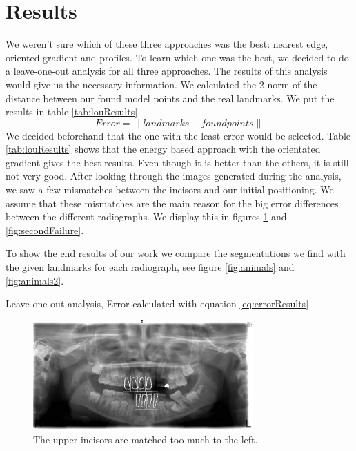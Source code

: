 \documentclass[a4paper,10pt]{article}
\begin{document}
\section{Results}\label{sec:results}

We weren't sure which of these three approaches was the best: nearest edge, oriented gradient and profiles. To learn which one was the best, we decided to do a leave-one-out analysis for all three approaches.  The results of this analysis would give us the necessary information. We calculated the 2-norm of the distance between our found model points and the real landmarks. We put the results in table \ref{tab:louResults}.
\begin{equation} \label{eq:errorResults}
Error = \|landmarks - foundpoints\|
\end{equation}
We decided beforehand that the one with the least error would be selected. Table  \ref{tab:louResults} shows that the energy based approach with the orientated gradient gives the best results. Even though it is better than the others, it is still not very good. After looking through the images generated during the analysis, we saw a few mismatches between the incisors and our initial positioning. We assume that these mismatches are the main reason for the big error differences between the different radiographs. We display this in figures \ref{fig:firstFailure} and \ref{fig:secondFailure}.

To show the end results of our work we compare the segmentations we find with the given landmarks for each radiograph, see figure \ref{fig:animals} and \ref{fig:animals2}.

\begin{table}
\begin{center}
\caption{Leave-one-out analysis, Error calculated with equation \ref{eq:errorResults}} \label{tab:louResults}
\end{center}
\end{table}

\begin{figure}[h!]
  \centering
    \includegraphics[width=0.75\textwidth]{images/firstFailure.jpg}
  \caption{The upper incisors are matched too much to the left.}
  \label{fig:firstFailure}
\end{figure}
\end{document}
